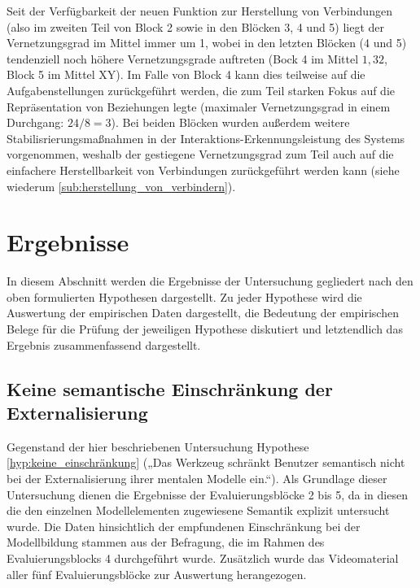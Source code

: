 Seit der Verfügbarkeit der neuen Funktion zur Herstellung von Verbindungen (also im zweiten Teil von Block 2 sowie in den Blöcken 3, 4 und 5) liegt der Vernetzungsgrad im Mittel immer um 1, wobei in den letzten Blöcken (4 und 5) tendenziell noch höhere Vernetzungsgrade auftreten (Bock 4 im Mittel $1,32$, Block 5 im Mittel XY). Im Falle von Block 4 kann dies teilweise auf die Aufgabenstellungen zurückgeführt werden, die zum Teil starken Fokus auf die Repräsentation von Beziehungen legte (maximaler Vernetzungsgrad in einem Durchgang: $24/8=3$). Bei beiden Blöcken wurden außerdem weitere Stabilisrierungsmaßnahmen in der Interaktions-Erkennungsleistung des Systems vorgenommen, weshalb der gestiegene Vernetzungsgrad zum Teil auch auf die einfachere Herstellbarkeit von Verbindungen zurückgeführt werden kann (siehe wiederum \ref{sub:herstellung_von_verbindern}).


\section{Ergebnisse} %
\label{sec:m_ergebnisse}

In diesem Abschnitt werden die Ergebnisse der Untersuchung gegliedert nach den oben formulierten Hypothesen dargestellt. Zu jeder Hypothese wird die Auswertung der empirischen Daten dargestellt, die Bedeutung der empirischen Belege für die Prüfung der jeweiligen Hypothese diskutiert und letztendlich das Ergebnis zusammenfassend dargestellt.  

\subsection{Keine semantische Einschränkung der Externalisierung} %
\label{sub:keine_semantische_einschränkung_der_externalisierung}

Gegenstand der hier beschriebenen Untersuchung Hypothese \ref{hyp:keine_einschränkung} („Das Werkzeug schränkt Benutzer semantisch nicht bei der Externalisierung ihrer mentalen Modelle ein.“). Als Grundlage dieser Untersuchung dienen die Ergebnisse der Evaluierungsblöcke 2 bis 5, da in diesen die den einzelnen Modellelementen zugewiesene Semantik explizit untersucht wurde. Die Daten hinsichtlich der empfundenen Einschränkung bei der Modellbildung stammen aus der Befragung, die im Rahmen des Evaluierungsblocks 4 durchgeführt wurde. Zusätzlich wurde das Videomaterial aller fünf Evaluierungsblöcke zur Auswertung herangezogen.

